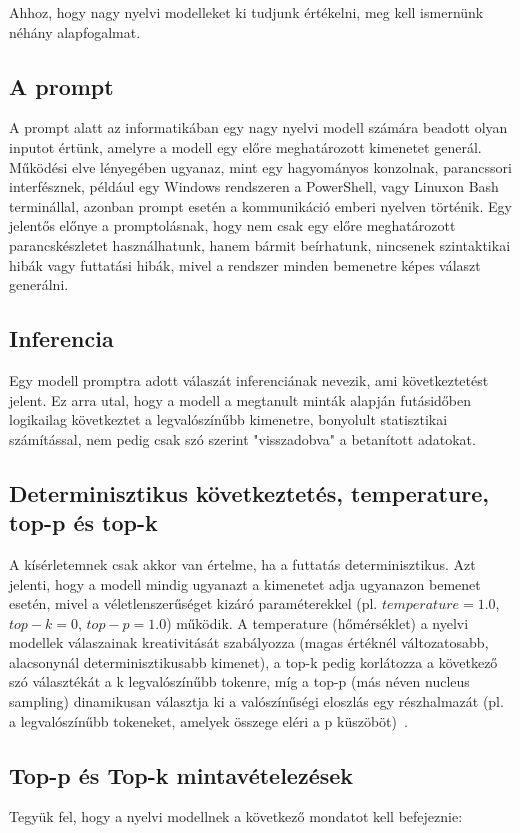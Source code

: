 \documentclass[12pt]{report}
\theoremstyle{definition}
\begin{document}
Ahhoz, hogy nagy nyelvi modelleket ki tudjunk értékelni, meg kell ismernünk néhány alapfogalmat.

\subsection{A prompt}
A prompt alatt az informatikában egy nagy nyelvi modell számára beadott olyan inputot értünk, amelyre a modell egy előre meghatározott kimenetet generál. Működési elve lényegében ugyanaz, mint egy hagyományos konzolnak, parancssori interfésznek, például egy Windows rendszeren a PowerShell, vagy Linuxon Bash terminállal, azonban prompt esetén a kommunikáció emberi nyelven történik.
Egy jelentős előnye a promptolásnak, hogy nem csak egy előre meghatározott parancskészletet használhatunk, hanem bármit beírhatunk, nincsenek szintaktikai hibák vagy futtatási hibák, mivel a rendszer minden bemenetre képes választ generálni.

\subsection{Inferencia}
Egy modell promptra adott válaszát inferenciának nevezik, ami következtetést jelent. Ez arra utal, hogy a modell a megtanult minták alapján futásidőben logikailag következtet a legvalószínűbb kimenetre, bonyolult statisztikai számítással, nem pedig csak szó szerint "visszadobva" a betanított adatokat.

\subsection{Determinisztikus következtetés, temperature, top-p és top-k}
A kísérletemnek csak akkor van értelme, ha a futtatás determinisztikus. Azt jelenti, hogy a modell mindig ugyanazt a kimenetet adja ugyanazon bemenet esetén, mivel a véletlenszerűséget kizáró paraméterekkel (pl. $temperature=1.0$, $top-k=0$, $top-p=1.0$) működik. A temperature (hőmérséklet) a nyelvi modellek válaszainak kreativitását szabályozza (magas értéknél változatosabb, alacsonynál determinisztikusabb kimenet), a top-k pedig korlátozza a következő szó választékát a k legvalószínűbb tokenre, míg a top-p (más néven nucleus sampling) dinamikusan választja ki a valószínűségi eloszlás egy részhalmazát (pl. a legvalószínűbb tokeneket, amelyek összege eléri a p küszöböt)~\cite{holtzman2020curious}.

\subsection{Top-p és Top-k mintavételezések}
Tegyük fel, hogy a nyelvi modellnek a következő mondatot kell befejeznie:
\end{document}
